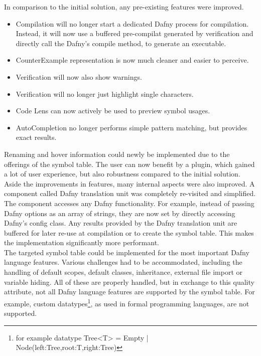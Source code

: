 In comparison to the initial solution, any pre-existing features were improved.

\begin{itemize}
 \item Compilation will no longer start a dedicated Dafny process for compilation. Instead, it will now use a buffered pre-compilat generated by verification and directly call the Dafny's compile method, to generate an executable.
 \item CounterExample representation is now much cleaner and easier to perceive.
 \item Verification will now also show warnings.
 \item Verification will no longer just highlight single characters.
 \item Code Lens can now actively be used to preview symbol usages.
 \item AutoCompletion no longer performs simple pattern matching, but provides exact results.
\end{itemize}
Renaming and hover information could newly be implemented due to the offerings of the symbol table.
The user can now benefit by a plugin, which gained a lot of user experience, but also robustness compared to the initial solution.\\

Aside the improvements in features, many internal aspects were also improved.
A component called Dafny translation unit was completely re-visited and simplified.
The component accesses any Dafny functionality.
For example, instead of passing Dafny options as an array of strings, they are now set by
directly accessing Dafny's config class.
Any results provided by the Dafny translation unit are buffered for later re-use at compilation or to create the symbol table.
This makes the implementation significantly more performant.\\

The targeted symbol table could be implemented for the most important Dafny language features.
Various challenges had to be accommodated, including the handling of default scopes, default classes, inheritance, external file import or variable hiding.
All of these are properly handled, but in exchange to this quality attribute, not all Dafny language features are supported by the symbol table.
For example, custom datatypes\footnote{for example datatype Tree<T> = Empty | Node(left:Tree,root:T,right:Tree)}, as used in formal programming languages, are not supported.\\

